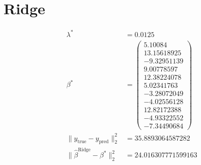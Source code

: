 \documentclass[11pt, a4paper, oneside]{memoir}
\begin{document}
\section{Ridge}
\begin{align*}
  \lambda^* &= 0.0125 \\
  \beta^* &= \begin{pmatrix}
    5.10084 \\
    13.15618925 \\
    -9.32951139 \\
    9.00778597 \\
    12.38224078 \\
    5.02341763 \\
    -3.28072049 \\
    -4.02556128 \\
    12.82172388 \\
    -4.93322552 \\
    -7.34490684
  \end{pmatrix} \\
  \|y_{\text{true}} - y_{\text{pred}}\|_2^2 &= 35.8893064587282 \\
  \|\hat{\beta}^{\text{Ridge}} - \beta^*\|_2^2 &= 24.016307771599163
\end{align*}
\label{LastPage}
\end{document}
